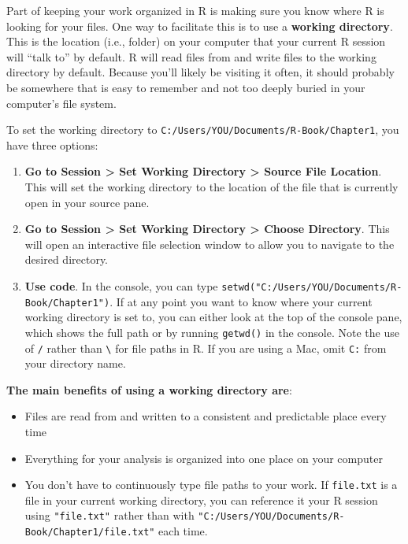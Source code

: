 \documentclass[]{book}
\providecommand{\tightlist}{%
  \setlength{\itemsep}{0pt}\setlength{\parskip}{0pt}}
\theoremstyle{definition}
\theoremstyle{definition}
\theoremstyle{definition}
\theoremstyle{remark}
\begin{document}
Part of keeping your work organized in R is making sure you know where R
is looking for your files. One way to facilitate this is to use a
\textbf{working directory}. This is the location (i.e., folder) on your
computer that your current R session will ``talk to'' by default. R will
read files from and write files to the working directory by default.
Because you'll likely be visiting it often, it should probably be
somewhere that is easy to remember and not too deeply buried in your
computer's file system.

To set the working directory to
\texttt{C:/Users/YOU/Documents/R-Book/Chapter1}, you have three options:

\begin{enumerate}
\def\labelenumi{\arabic{enumi}.}
\item
  \textbf{Go to Session \textgreater{} Set Working Directory
  \textgreater{} Source File Location}. This will set the working
  directory to the location of the file that is currently open in your
  source pane.
\item
  \textbf{Go to Session \textgreater{} Set Working Directory
  \textgreater{} Choose Directory}. This will open an interactive file
  selection window to allow you to navigate to the desired directory.
\item
  \textbf{Use code}. In the console, you can type
  \texttt{setwd("C:/Users/YOU/Documents/R-Book/Chapter1")}. If at any
  point you want to know where your current working directory is set to,
  you can either look at the top of the console pane, which shows the
  full path or by running \texttt{getwd()} in the console. Note the use
  of \texttt{/} rather than \texttt{\textbackslash{}} for file paths in
  R. If you are using a Mac, omit \texttt{C:} from your directory name.
\end{enumerate}

\textbf{The main benefits of using a working directory are}:

\begin{itemize}
\tightlist
\item
  Files are read from and written to a consistent and predictable place
  every time
\item
  Everything for your analysis is organized into one place on your
  computer
\item
  You don't have to continuously type file paths to your work. If
  \texttt{file.txt} is a file in your current working directory, you can
  reference it your R session using \texttt{"file.txt"} rather than with
  \texttt{"C:/Users/YOU/Documents/R-Book/Chapter1/file.txt"} each time.
\end{itemize}
\end{document}
